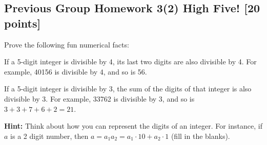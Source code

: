 \documentclass[12pt]{exam}
\begin{document}
\subsection*{Previous Group Homework 3(2) High Five! [20 points]}
Prove the following fun numerical facts:
\begin{qparts}
\item If a 5-digit integer is divisible by 4, its last two digits are also
divisible by 4. For example, 40156 is divisible by 4, and so is 56.
\item If a 5-digit integer is divisible by 3, the sum of the digits of that
integer is also divisible by 3. For example, 33762 is divisible by 3, and so is
$3+3+7+6+2=21.$
\end{qparts}
\textbf{Hint:} Think about how you can represent the digits of an integer. For
instance, if $a$ is a 2 digit number, then $a = a_1a_2 = a_1\cdot 10 +a_2\cdot 1$ (fill in the blanks).
\end{document}
